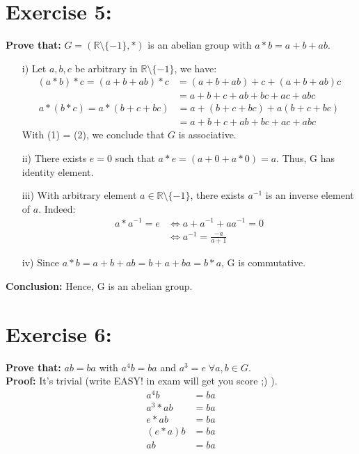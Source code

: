 \documentclass{article}
\newcommand{\R}{\mathbb{R}}
\begin{document}
	\section{Exercise 5:}
		\textbf{Prove that:} $G = (\R\setminus\{-1\}, *)$ is an abelian group with $a*b=a+b+ab$.
		\begin{enumerate}
			\item [i)]
				Let $a, b, c$ be arbitrary in $\R\setminus\{-1\}$, we have:
				\begin{align*}
					(a*b)*c = (a+b+ab)*c &= (a+b+ab) + c + (a+b+ab)c \\
										 &= a+b+c +ab+bc+ac+abc\tag{1}
				\end{align*}
				\begin{align*}
					a*(b*c) = a*(b+c+bc) &= a + (b+c+bc) + a(b+c+bc) \\
										 &= a+b+c +ab+bc+ac+abc\tag{2}
				\end{align*}
				With (1) = (2), we conclude that $G$ is associative.
			\item[ii)]
				There exists $e=0$ such that $a*e = (a+0+a*0) = a$. Thus, G has identity element.
			\item[iii)]
				With arbitrary element $a \in \R\setminus\{-1\}$, there exists $a^{-1}$ is an inverse element of $a$. Indeed:
				\begin{align*}
					a*a^{-1} = e &\iff a+a^{-1}+aa^{-1} = 0\\
								 &\iff a^{-1} = \frac{-a}{a+1}
				\end{align*}
			\item[iv)]
				Since $a*b = a+b+ab = b+a+ba = b*a$, G is commutative.
		\end{enumerate}
		\textbf{Conclusion:} Hence, G is an abelian group.
	
	\section{Exercise 6:}
		\textbf{Prove that:} $ab=ba$ with $a^4b = ba$ and $a^3 = e \;\forall a,b \in G$.\\
		\textbf{Proof:} It's trivial (write EASY! in exam will get you score ;) ).
		\begin{align*}
			a^4b &= ba\\
			a^3*ab &= ba\\
			e*ab &= ba\\
			(e*a)b &= ba\\
			ab &= ba\tag{Q.E.D}
		\end{align*}
		
\end{document}
